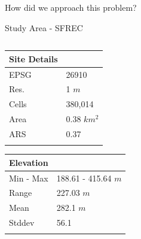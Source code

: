 \documentclass[
  ignorenonframetext,
]{beamer}
\begin{document}
\begin{frame}[fragile]{How did we approach this problem?}
\begin{block}{Study Area - SFREC}
\begin{columns}[T]
\begin{column}{0.5\textwidth}
\begin{longtable}[]{@{}ll@{}}
\toprule\noalign{}
Site Details & \\
\midrule\noalign{}
\endhead
EPSG & 26910 \\
Res. & 1 \(m\) \\
Cells & 380,014 \\
Area & 0.38 \(km^2\) \\
ARS & 0.37 \\
\bottomrule\noalign{}
\end{longtable}

\begin{longtable}[]{@{}ll@{}}
\toprule\noalign{}
Elevation & \\
\midrule\noalign{}
\endhead
Min - Max & 188.61 - 415.64 \(m\) \\
Range & 227.03 \(m\) \\
Mean & 282.1 \(m\) \\
Stddev & 56.1 \\
\bottomrule\noalign{}
\end{longtable}
\end{column}
\end{columns}
\end{block}


\end{frame}
\end{document}
